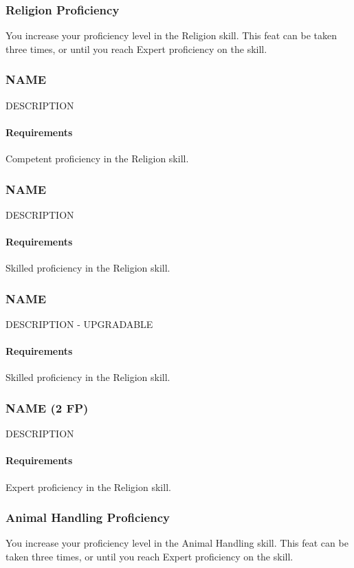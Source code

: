 \subsubsection{Religion Proficiency} \label{feat::religionprof}
    You increase your proficiency level in the Religion skill.
    This feat can be taken three times, or until you reach Expert proficiency on the skill.
\subsubsection{NAME} \label{feat::name}
    DESCRIPTION
    \paragraph{Requirements} Competent proficiency in the Religion skill.
\subsubsection{NAME} \label{feat::name}
    DESCRIPTION
    \paragraph{Requirements} Skilled proficiency in the Religion skill.
\subsubsection{NAME} \label{feat::name}
    DESCRIPTION - UPGRADABLE
    \paragraph{Requirements} Skilled proficiency in the Religion skill.
\subsubsection{NAME (2 FP)} \label{feat::name}
    DESCRIPTION
    \paragraph{Requirements} Expert proficiency in the Religion skill.
\subsubsection{Animal Handling Proficiency} \label{feat::animalhandlingprof}
    You increase your proficiency level in the Animal Handling skill.
    This feat can be taken three times, or until you reach Expert proficiency on the skill.
